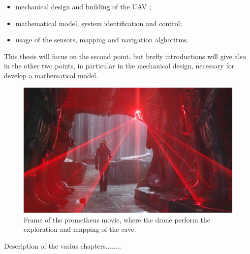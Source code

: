 \begin{itemize}
	\item mechanical design and building of the UAV \cite{Carlos};
	\item mathematical model, system identification and control;
	\item usage of the sensors, mapping and navigation alghoritms.
\end{itemize}

\noindent This thesis will focus on the second point, but brefly introductions will give also in the other two points, in particular in the mechanical design, necessary for develop a mathematical model. 

\begin{figure}
	\includegraphics[scale=0.6]{images/prometheus_film.jpg}
	\caption{Frame of the prometheus movie, where the drone perform the exploration and mapping of the cave.}
	\label{fig:prometheusFILM}
\end{figure}

\noindent Description of the varius chapters........